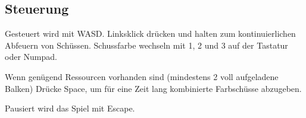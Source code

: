 \documentclass[a4paper,10pt,ngerman,fontsize=12pt]{scrreprt}
\begin{document}
\subsection{Steuerung}

Gesteuert wird mit WASD. Linksklick drücken und halten zum kontinuierlichen Abfeuern von Schüssen. Schussfarbe wechseln mit 1, 2 und 3 auf der Tastatur oder Numpad.

Wenn genügend Ressourcen vorhanden sind (mindestens 2 voll aufgeladene Balken) Drücke Space, um für eine Zeit lang kombinierte Farbschüsse abzugeben.

Pausiert wird das Spiel mit Escape.
\end{document}
